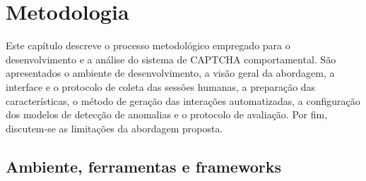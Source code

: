 %
%

\chapter{Metodologia}

Este capítulo descreve o processo metodológico empregado para o desenvolvimento e a análise do sistema de CAPTCHA comportamental. São apresentados o ambiente de desenvolvimento, a visão geral da abordagem, a interface e o protocolo de coleta das sessões humanas, a preparação das características, o método de geração das interações automatizadas, a configuração dos modelos de detecção de anomalias e o protocolo de avaliação. Por fim, discutem-se as limitações da abordagem proposta.

\section{Ambiente, ferramentas e frameworks}

